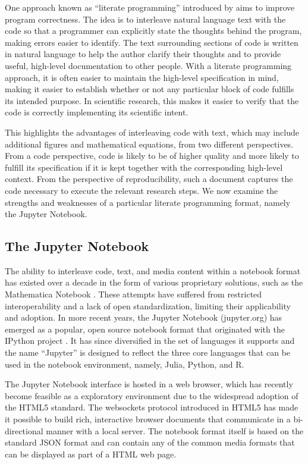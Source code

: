 \documentclass[phd,ianc,twoside]{infthesis}
\begin{document}
One approach known as ``literate programming'' introduced by
\citet{knuth_computerjournal84} aims to improve program correctness. The
idea is to interleave natural language text with the code so that a
programmer can explicitly state the thoughts behind the program, making
errors easier to identify. The text surrounding sections of code is
written in natural language to help the author clarify their thoughts
and to provide useful, high-level documentation to other people. With a
literate programming approach, it is often easier to maintain the
high-level specification in mind, making it easier to establish whether
or not any particular block of code fulfills its intended purpose. In
scientific research, this makes it easier to verify that the code is
correctly implementing its scientific intent.

This highlights the advantages of interleaving code with text, which may
include additional figures and mathematical equations, from two
different perspectives. From a code perspective, code is likely to be of
higher quality and more likely to fulfill its specification if it is
kept together with the corresponding high-level context. From the
perspective of reproducibility, such a document captures the code
necessary to execute the relevant research steps. We now examine the
strengths and weaknesses of a particular literate programming format,
namely the Jupyter Notebook.


\subsection{The Jupyter Notebook}

The ability to interleave code, text, and media content within a
notebook format has existed over a decade in the form of various
proprietary solutions, such as the Mathematica Notebook
\citep{wolfram_book03}. These attempts have suffered from restricted
interoperability and a lack of open standardization, limiting their
applicability and adoption. In more recent years, the Jupyter Notebook
(\textsf{jupyter.org}) has emerged as a popular, open source notebook
format that originated with the IPython project \citep{perez_cse07}. It
has since diversified in the set of languages it supports and the name
``Jupyter'' is designed to reflect the three core languages that can be
used in the notebook environment, namely, Julia, Python, and R.

The Jupyter Notebook interface is hosted in a web browser, which has
recently become feasible as a exploratory environment due to the
widespread adoption of the HTML5 
standard. The websockets protocol introduced in HTML5 has made it
possible to build rich, interactive browser documents that communicate
in a bi-directional manner with a local server. The notebook format
itself is based on the standard JSON format and can contain any of the
common media formats that can be displayed as part of a HTML web page.
\end{document}

